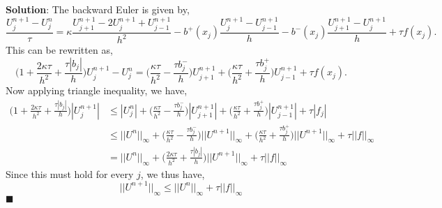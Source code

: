 \documentclass[11pt]{article}
\begin{document}
\vskip 1cm


\textbf{Solution}: The backward Euler is given by,
\begin{equation*}
    \frac{U^{n+1}_j - U^n_j}{\tau} = \kappa \frac{U^{n+1}_{j+1} - 2U^{n+1}_j + U^{n+1}_{j-1}}{h^2} - b^+(x_j) \frac{U^{n+1}_j - U^{n+1}_{j-1}}{h} - b^-(x_j) \frac{U^{n+1}_{j+1} - U^{n+1}_j}{h} + \tau f(x_j).
\end{equation*}
This can be rewritten as,
\begin{equation*}
    \big(1 + \frac{2\kappa \tau}{h^2} + \frac{\tau |b_j|}{h} \big) U^{n+1}_j - U^n_j = \big( \frac{\kappa \tau}{h^2} - \frac{\tau b^-_j}{h} \big) U^{n+1}_{j+1} + \big( \frac{\kappa \tau}{h^2} + \frac{\tau b^+_j}{h} \big) U^{n+1}_{j-1} + \tau f(x_j).
\end{equation*}
Now applying triangle inequality, we have,
\begin{align*}
    \big(1 + \frac{2\kappa \tau}{h^2} + \frac{\tau |b_j|}{h} \big) |U^{n+1}_j| &\leq |U^n_j| + \big( \frac{\kappa \tau}{h^2} - \frac{\tau b^-_j}{h} \big) |U^{n+1}_{j+1}| + \big( \frac{\kappa \tau}{h^2} + \frac{\tau b^+_j}{h} \big) |U^{n+1}_{j-1}| + \tau |f_j| \\
    &\leq ||U^n||_\infty + \big( \frac{\kappa \tau}{h^2} - \frac{\tau b^-_j}{h} \big) ||U^{n+1}||_\infty + \big( \frac{\kappa \tau}{h^2} + \frac{\tau b^+_j}{h} \big) ||U^{n+1}||_\infty + \tau ||f||_\infty \\
    &= ||U^n||_\infty + \big( \frac{2\kappa \tau}{h^2} + \frac{\tau |b_j|}{h} \big) ||U^{n+1}||_\infty + \tau ||f||_\infty 
\end{align*}
Since this must hold for every $j$, we thus have,
\begin{equation*}
    ||U^{n+1}||_\infty \leq ||U^n||_\infty + \tau ||f||_\infty
\end{equation*}
$\blacksquare$
\end{document}

